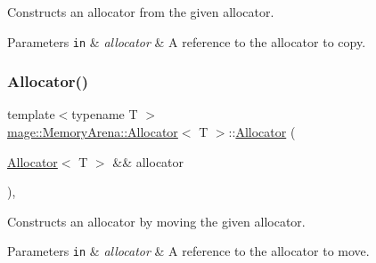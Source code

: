 Constructs an allocator from the given allocator.


\begin{DoxyParams}[1]{Parameters}
\mbox{\tt in}  & {\em allocator} & A reference to the allocator to copy. \\
\hline
\end{DoxyParams}
\mbox{\label{classmage_1_1_memory_arena_1_1_allocator_a153cec9d65f697b3e8631c866b2abe96}} 
\subsubsection{\texorpdfstring{Allocator()}{Allocator()}\hspace{0.1cm}{\footnotesize\ttfamily [2/4]}}
{\footnotesize\ttfamily template$<$typename T $>$ \\
\mbox{\hyperlink{classmage_1_1_memory_arena_1_1_allocator}{mage\+::\+Memory\+Arena\+::\+Allocator}}$<$ T $>$\+::\mbox{\hyperlink{classmage_1_1_memory_arena_1_1_allocator}{Allocator}} (\begin{DoxyParamCaption}\item[{\mbox{\hyperlink{classmage_1_1_memory_arena_1_1_allocator}{Allocator}}$<$ T $>$ \&\&}]{allocator }\end{DoxyParamCaption})\hspace{0.3cm}{\ttfamily [default]}, {\ttfamily [noexcept]}}

Constructs an allocator by moving the given allocator.


\begin{DoxyParams}[1]{Parameters}
\mbox{\tt in}  & {\em allocator} & A reference to the allocator to move. \\
\hline
\end{DoxyParams}
\mbox{\label{classmage_1_1_memory_arena_1_1_allocator_a412318dd063697fc4a2238c131b5e0e9}} 
